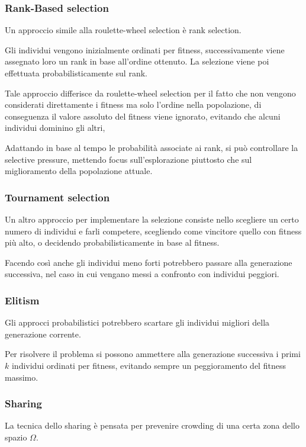 \documentclass[a4paper]{article}
\begin{document}
\subsubsection{Rank-Based selection}
Un approccio simile alla roulette-wheel selection è rank selection.

Gli individui vengono inizialmente ordinati per fitness, successivamente viene 
assegnato loro un rank in base all'ordine ottenuto.
La selezione viene poi effettuata probabilisticamente sul rank.

Tale approccio differisce da roulette-wheel selection per il fatto che non vengono 
considerati direttamente i fitness ma solo l'ordine nella popolazione, 
di conseguenza il valore assoluto del fitness viene ignorato, evitando che 
alcuni individui dominino gli altri,

Adattando in base al tempo le probabilità associate ai rank, si può controllare
la selective pressure, mettendo focus sull'esplorazione piuttosto che sul miglioramento
della popolazione attuale.

\subsubsection{Tournament selection}
Un altro approccio per implementare la selezione consiste nello scegliere
un certo numero di individui e farli competere, scegliendo come vincitore
quello con fitness più alto, o decidendo probabilisticamente in base al fitness.

Facendo così anche gli individui meno forti potrebbero passare alla generazione successiva, 
nel caso in cui vengano messi a confronto con individui peggiori.

\subsubsection{Elitism}
Gli approcci probabilistici potrebbero scartare gli individui migliori 
della generazione corrente.

Per risolvere il problema si possono ammettere alla generazione successiva i primi $k$
individui ordinati per fitness, evitando sempre un peggioramento del fitness massimo.

\subsubsection{Sharing}
La tecnica dello sharing è pensata per prevenire crowding di una certa zona 
dello spazio $\Omega$.
\end{document}
